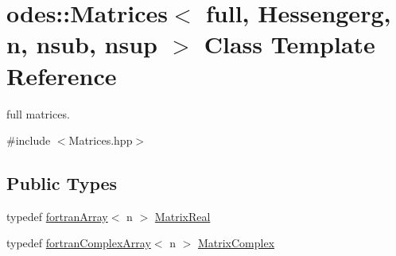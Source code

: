 \hypertarget{classodes_1_1Matrices}{\section{odes\-:\-:Matrices$<$ full, Hessengerg, n, nsub, nsup $>$ Class Template Reference}
\label{classodes_1_1Matrices}
}


full matrices.  




{\ttfamily \#include $<$Matrices.\-hpp$>$}

\subsection*{Public Types}
\begin{DoxyCompactItemize}
\item 
typedef \hyperlink{classodes_1_1fortranArray}{fortran\-Array}$<$ n $>$ \hyperlink{classodes_1_1Matrices_aa028f1e52916558a51d333ac8b081030}{Matrix\-Real}
\item 
typedef \hyperlink{classodes_1_1fortranComplexArray}{fortran\-Complex\-Array}$<$ n $>$ \hyperlink{classodes_1_1Matrices_aa1313b5ab7fdab6f5320c8d5aa3bfc24}{Matrix\-Complex}
\end{DoxyCompactItemize}
